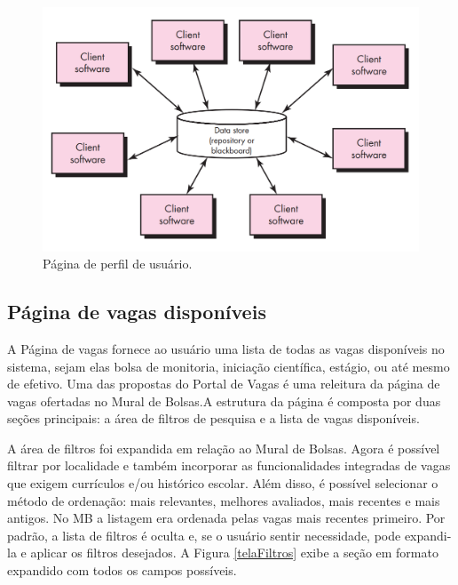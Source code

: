 \documentclass[cic,tc]{iiufrgs}
\begin{document}
\begin{figure}[ht]
    \caption{Página de perfil de usuário.}
        \begin{center}
            \includegraphics[width=1\textwidth]{figuras/arquitetura-centralizada-dados.png}
        \end{center}
    \label{telaUserProfile}
\end{figure}

\subsection{Página de vagas disponíveis}
\label{PDVFunVagas}

A Página de vagas fornece ao usuário uma lista de todas as vagas disponíveis no sistema, sejam elas bolsa de monitoria, iniciação científica, estágio, ou até mesmo de efetivo. Uma das propostas do Portal de Vagas é uma releitura da página de vagas ofertadas no Mural de Bolsas.A estrutura da página é composta por duas seções principais: a área de filtros de pesquisa e a lista de vagas disponíveis.

A área de filtros foi expandida em relação ao Mural de Bolsas. Agora é possível filtrar por localidade e também incorporar as funcionalidades integradas de vagas que exigem currículos e/ou histórico escolar. Além disso, é possível selecionar o método de ordenação: mais relevantes, melhores avaliados, mais recentes e mais antigos. No MB a listagem era ordenada pelas vagas mais recentes primeiro. Por padrão, a lista de filtros é oculta e, se o usuário sentir necessidade, pode expandi-la e aplicar os filtros desejados. A Figura \ref{telaFiltros} exibe a seção em formato expandido com todos os campos possíveis.
\end{document}
